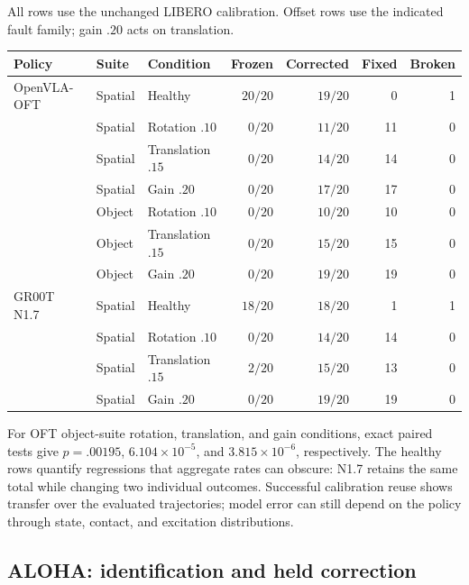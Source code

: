 All rows use the unchanged LIBERO calibration. Offset rows use the indicated fault
family; gain $.20$ acts on translation.
\begin{center}\small
\begin{tabular}{lllrrrr}
\toprule
Policy & Suite & Condition & Frozen & Corrected & Fixed & Broken\\
\midrule
OpenVLA-OFT & Spatial & Healthy & $20/20$ & $19/20$ & 0 & 1\\
 & Spatial & Rotation $.10$ & $0/20$ & $11/20$ & 11 & 0\\
 & Spatial & Translation $.15$ & $0/20$ & $14/20$ & 14 & 0\\
 & Spatial & Gain $.20$ & $0/20$ & $17/20$ & 17 & 0\\
 & Object & Rotation $.10$ & $0/20$ & $10/20$ & 10 & 0\\
 & Object & Translation $.15$ & $0/20$ & $15/20$ & 15 & 0\\
 & Object & Gain $.20$ & $0/20$ & $19/20$ & 19 & 0\\
\midrule
GR00T N1.7 & Spatial & Healthy & $18/20$ & $18/20$ & 1 & 1\\
 & Spatial & Rotation $.10$ & $0/20$ & $14/20$ & 14 & 0\\
 & Spatial & Translation $.15$ & $2/20$ & $15/20$ & 13 & 0\\
 & Spatial & Gain $.20$ & $0/20$ & $19/20$ & 19 & 0\\
\bottomrule
\end{tabular}
\end{center}
For OFT object-suite rotation, translation, and gain conditions, exact paired tests
give $p=.00195$, $6.104\times10^{-5}$, and $3.815\times10^{-6}$, respectively.
The healthy rows quantify regressions that aggregate rates can obscure: N1.7 retains
the same total while changing two individual outcomes. Successful calibration reuse
shows transfer over the evaluated trajectories; model error can still depend on the
policy through state, contact, and excitation distributions.

\subsection{ALOHA: identification and held correction}


